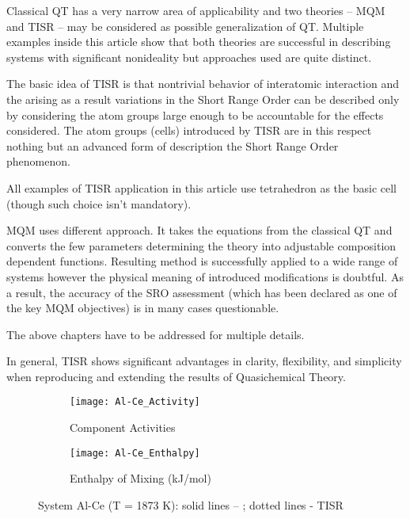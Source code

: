 \documentclass[12pt,abstract]{scrartcl}
\begin{document}
Classical QT has a very narrow area of applicability and two theories -- MQM and TISR -- may be considered as possible generalization of QT. Multiple examples inside this article show that both theories are successful in describing systems with significant nonideality but approaches used are quite distinct.

The basic idea of TISR is that nontrivial behavior of interatomic interaction and the arising as a result  variations in the Short Range  Order  can be described only by considering the atom groups large enough to be accountable for the effects considered. 
The atom groups (cells) introduced by TISR are in this respect nothing but an advanced form of description the Short Range  Order  phenomenon.

All examples of TISR application in this article use tetrahedron as the basic cell (though such choice isn't mandatory). 



MQM uses different approach. It takes the equations from the classical QT and converts the few parameters determining the theory  into adjustable composition dependent functions. Resulting method is successfully applied to a wide range of systems however the physical meaning of introduced modifications is doubtful. 
As a result, the accuracy of the SRO assessment (which has been declared as one of the key MQM objectives) is in many cases questionable.

 The above chapters have to be addressed for multiple details.

In general, TISR shows significant advantages in clarity, flexibility, and simplicity when reproducing and extending the results of Quasichemical Theory.

\newpage




\begin{figure}[h]
\centering
\begin{subfigure}{.5\textwidth}
  \centering
  \texttt{[image: Al-Ce\_Activity]}
  \caption{Component Activities}
  \label{fig:Ag-In1}
\end{subfigure}%
\begin{subfigure}{.5\textwidth}
  \centering
  \texttt{[image: Al-Ce\_Enthalpy]}
  \caption{Enthalpy of Mixing (kJ/mol)}
  \label{fig:Ag-In2}
\end{subfigure}
\caption{System Al-Ce (T = 1873 K): solid lines -- \cite{Al-Sc_Data}; dotted lines - TISR}
\label{fig:Al-Ce}
\end{figure}
\end{document}
